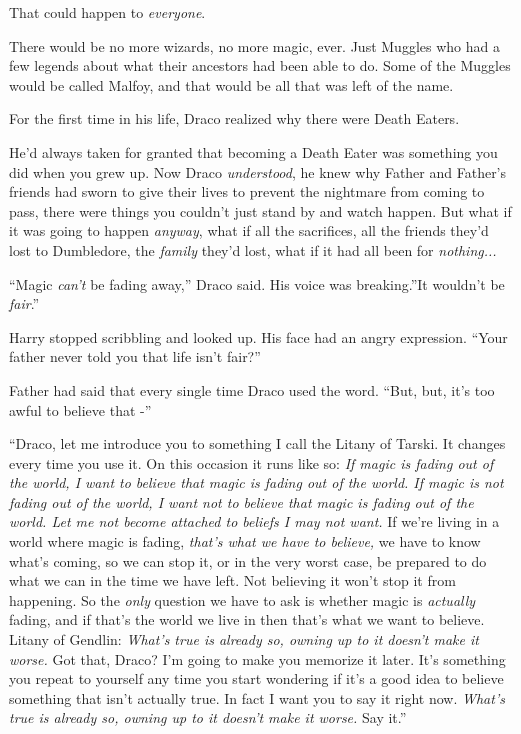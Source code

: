That could happen to \emph{everyone}.

There would be no more wizards, no more magic, ever. Just Muggles who
had a few legends about what their ancestors had been able to do. Some
of the Muggles would be called Malfoy, and that would be all that was
left of the name.

For the first time in his life, Draco realized why there were Death
Eaters.

He'd always taken for granted that becoming a Death Eater was something
you did when you grew up. Now Draco \emph{understood}, he knew why
Father and Father's friends had sworn to give their lives to prevent the
nightmare from coming to pass, there were things you couldn't just stand
by and watch happen. But what if it was going to happen \emph{anyway},
what if all the sacrifices, all the friends they'd lost to Dumbledore,
the \emph{family} they'd lost, what if it had all been for
\emph{nothing...}

``Magic \emph{can't} be fading away,'' Draco said. His voice was
breaking.''It wouldn't be \emph{fair}.''

Harry stopped scribbling and looked up. His face had an angry
expression. ``Your father never told you that life isn't fair?''

Father had said that every single time Draco used the word. ``But, but,
it's too awful to believe that -''

``Draco, let me introduce you to something I call the Litany of Tarski.
It changes every time you use it. On this occasion it runs like so:
\emph{If magic is fading out of the world, I want to believe that magic
is fading out of the world. If magic is not fading out of the world, I
want not to believe that magic is fading out of the world. Let me not
become attached to beliefs I may not want.} If we're living in a world
where magic is fading, \emph{that's what we have to believe,} we have to
know what's coming, so we can stop it, or in the very worst case, be
prepared to do what we can in the time we have left. Not believing it
won't stop it from happening. So the \emph{only} question we have to ask
is whether magic is \emph{actually} fading, and if that's the world we
live in then that's what we want to believe. Litany of Gendlin:
\emph{What's true is already so, owning up to it doesn't make it worse.}
Got that, Draco? I'm going to make you memorize it later. It's something
you repeat to yourself any time you start wondering if it's a good idea
to believe something that isn't actually true. In fact I want you to say
it right now. \emph{What's true is already so, owning up to it doesn't
make it worse.} Say it.''

